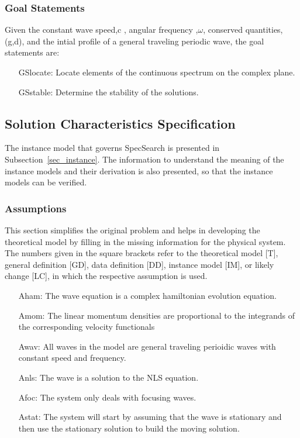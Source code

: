 \documentclass[12pt]{article}
\begin{document}
\subsubsection{Goal Statements}

\noindent Given the constant wave speed,c , angular frequency ,$\omega$, 
conserved quantities, (g,d), and the intial profile of a general traveling 
periodic wave, the goal statements are:

\begin{itemize}[leftmargin=.75in]

\item[GSlocate:] {Locate elements of the continuous spectrum on the 
complex plane. }

\item[GSstable:] {Determine the stability of the solutions.}

\end{itemize}

\subsection{Solution Characteristics Specification}

The instance model that governs SpecSearch is presented in
Subsection~\ref{sec_instance}.  The information to understand the meaning of the
instance models and their derivation is also presented, so that the instance
models can be verified.

\subsubsection{Assumptions}

This section simplifies the original problem and helps in developing the
theoretical model by filling in the missing information for the physical
system. The numbers given in the square brackets refer to the theoretical model
[T], general definition [GD], data definition [DD], instance model [IM], or
likely change [LC], in which the respective assumption is used.

\begin{itemize}[leftmargin=.5in]

\item[Aham:]The 
wave equation is a complex hamiltonian evolution equation. 
\item[Amom:]The 
linear momentum densities are proportional to the integrands of the 
corresponding velocity functionals 
\item[Awav:]All 
waves in the model are general traveling perioidic waves with constant speed 
and frequency. 
\item[Anls:]The 
wave is a solution to the NLS equation.
\item[Afoc:]The 
system only deals with focusing waves.
\item[Astat:] The system will start by assuming that the wave is stationary and 
then use 
the stationary solution to build the moving solution.

\end{itemize}
\end{document}
